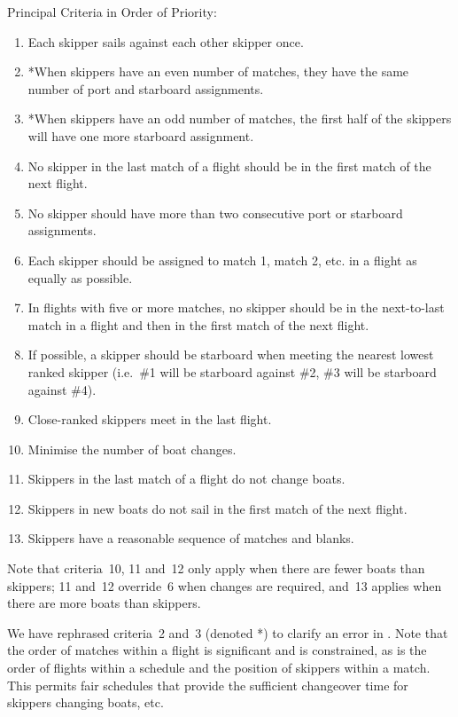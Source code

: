 \documentclass{llncs}
\begin{document}
\begin{framed}
\noindent Principal Criteria in Order of Priority:
\begin{enumerate}
\item Each skipper sails against each other skipper once.
\item *When skippers have an even number of matches, they have the same number of port and starboard
    assignments.
\item *When skippers have an odd number of matches, the first half of the skippers will have one
    more starboard assignment.
\item No skipper in the last match of a flight should be in the first match of the next flight.
\item No skipper should have more than two consecutive port or starboard assignments.
\item Each skipper should be assigned to match 1, match 2, etc. in a flight as equally as possible.
\item In flights with five or more matches, no skipper should be in the next-to-last match in a
    flight and then in the first match of the next flight.
\item If possible, a skipper should be starboard when meeting the nearest lowest ranked skipper
    (i.e.\ \#1 will be starboard against \#2, \#3 will be starboard against \#4).
\item Close-ranked skippers meet in the last flight.
\item Minimise the number of boat changes.
\item Skippers in the last match of a flight do not change boats.
\item Skippers in new boats do not sail in the first match of the next flight.
\item Skippers have a reasonable sequence of matches and blanks.
\end{enumerate}
Note that criteria~10, 11 and~12 only apply when there are fewer boats than skippers; 11 and~12
override~6 when changes are required, and~13 applies when there are more boats than skippers.
\end{framed}

We have rephrased criteria~2 and~3 (denoted *) to clarify an error in \cite{isaf}. Note that the
order of matches within a flight is significant and is constrained, as is the order of flights
within a schedule and the position of skippers within a match. This permits fair schedules that
provide the sufficient changeover time for skippers changing boats, etc.
\end{document}
